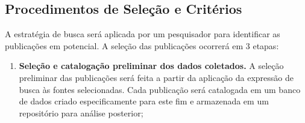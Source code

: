 \subsection{Procedimentos de Seleção e Critérios}

A estratégia de busca será aplicada por um pesquisador para identificar as publicações em potencial. A seleção das publicações ocorrerá em 3 etapas:

\begin{enumerate}
	\item \textbf{Seleção e catalogação preliminar dos dados coletados.} 
    A seleção preliminar das publicações será feita
a partir da aplicação da expressão de busca às fontes selecionadas. Cada publicação será catalogada em um banco de dados criado especificamente para este fim e armazenada em um repositório para análise posterior;


\end{enumerate}
